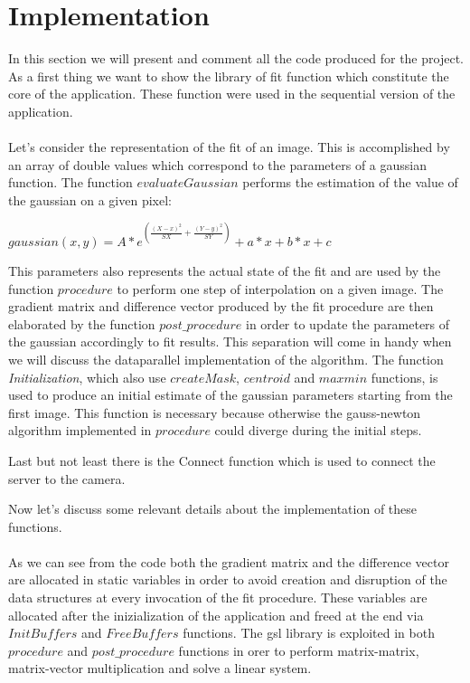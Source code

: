 \section{Implementation}

In this section we will present and comment all the code produced for the project.
As a first thing we want to show the library of fit function which constitute the core of the application.
These function were used in the sequential version of the application.
\ \\


\ \\Let's consider the representation of the fit of an image.
This is accomplished by an array of double values which correspond to the parameters of a gaussian function.
The function $evaluateGaussian$ performs the estimation of the value of the gaussian on a given pixel:
\begin{center}
	$gaussian(x,y) = A * e^{( \frac{(X-x)^2}{SX} + \frac{(Y-y)^2}{SY} )} +a*x +b*x +c$
\end{center} 
This parameters also represents the actual state of the fit and are used by the function $procedure$ to perform one step of interpolation on a given image.
The gradient matrix and difference vector produced by the fit procedure are then elaborated by the function $post\_procedure$ in order to update the parameters of the gaussian accordingly to fit results.
This separation will come in handy when we will discuss the dataparallel implementation of the algorithm.
The function \textit{Initialization}, which also use $createMask$, $centroid$ and $maxmin$ functions, is used to produce an initial estimate of the gaussian parameters starting from the first image.
This function is necessary because otherwise the gauss-newton algorithm implemented in $procedure$ could diverge during the initial steps.

Last but not least there is the Connect function which is used to connect the server to the camera.

Now let's discuss some relevant details about the implementation of these functions.
\ \\


\ \\As we can see from the code both the gradient matrix and the difference vector are allocated in static variables in order to avoid creation and disruption of the data structures at every invocation of the fit procedure. 
These variables are allocated after the inizialization of the application and freed at the end via $InitBuffers$ and $FreeBuffers$ functions.
The gsl library is exploited in both $procedure$ and $post\_procedure$ functions in orer to perform matrix-matrix, matrix-vector multiplication and solve a linear system.
\ \\
















